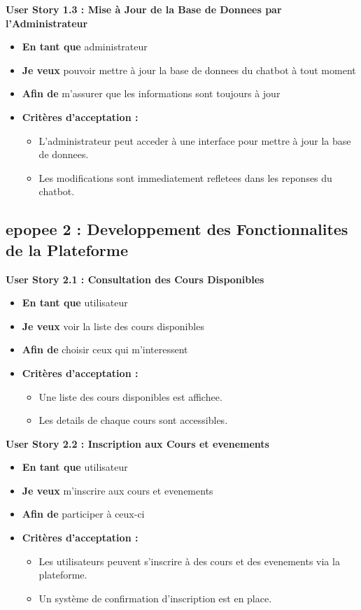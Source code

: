 \documentclass[a4paper, 11pt, openany]{report}
\begin{document}
\textbf{User Story 1.3 : Mise à Jour de la Base de Donnees par l'Administrateur}
\begin{itemize}
    \item \textbf{En tant que} administrateur
    \item \textbf{Je veux} pouvoir mettre à jour la base de donnees du chatbot à tout moment
    \item \textbf{Afin de} m'assurer que les informations sont toujours à jour
    \item \textbf{Critères d'acceptation :}
    \begin{itemize}
        \item L'administrateur peut acceder à une interface pour mettre à jour la base de donnees.
        \item Les modifications sont immediatement refletees dans les reponses du chatbot.
    \end{itemize}
\end{itemize}

\subsection{epopee 2 : Developpement des Fonctionnalites de la Plateforme}

\textbf{User Story 2.1 : Consultation des Cours Disponibles}
\begin{itemize}
    \item \textbf{En tant que} utilisateur
    \item \textbf{Je veux} voir la liste des cours disponibles
    \item \textbf{Afin de} choisir ceux qui m'interessent
    \item \textbf{Critères d'acceptation :}
    \begin{itemize}
        \item Une liste des cours disponibles est affichee.
        \item Les details de chaque cours sont accessibles.
    \end{itemize}
\end{itemize}

\textbf{User Story 2.2 : Inscription aux Cours et evenements}
\begin{itemize}
    \item \textbf{En tant que} utilisateur
    \item \textbf{Je veux} m'inscrire aux cours et evenements
    \item \textbf{Afin de} participer à ceux-ci
    \item \textbf{Critères d'acceptation :}
    \begin{itemize}
        \item Les utilisateurs peuvent s'inscrire à des cours et des evenements via la plateforme.
        \item Un système de confirmation d'inscription est en place.
    \end{itemize}
\end{itemize}
\end{document}
